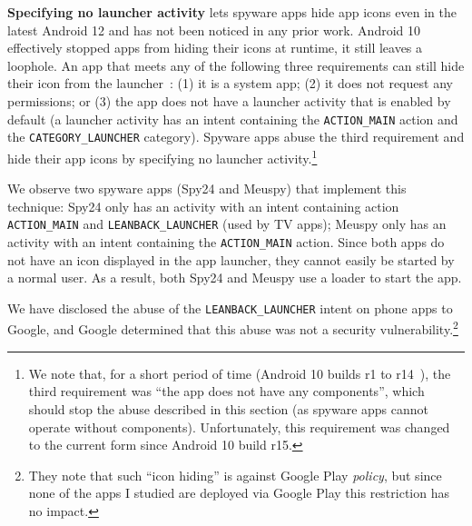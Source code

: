
\textbf{Specifying no launcher activity} lets spyware apps hide app
icons even in the latest Android 12 and has not been noticed in any prior work.
Android 10 effectively stopped apps from hiding their icons at
runtime, it still leaves a loophole. An app that meets any of the
following three requirements can still hide their icon from the
launcher~\cite{Launcher79:online}: (1) it is a system app; (2) it does
not request any permissions; or (3) the app does not have a launcher
activity that is enabled by default (a launcher activity has an intent
containing the \texttt{ACTION\_MAIN} action and the
\texttt{CATEGORY\_LAUNCHER} category). Spyware apps abuse the third
requirement and hide their app icons by specifying no launcher
activity.\footnote{We note that, for a short period of time (Android 10 builds r1 to r14~\cite{Launcher48:online}), the third requirement was ``the app does not have any components'', which should stop the abuse described in this section (as spyware apps cannot operate without components). Unfortunately, this requirement was changed to the current form since Android 10 build r15.\label{footnote:hide_icon}}

We observe two spyware apps (Spy24 and Meuspy) that implement this
technique: Spy24 only has an activity with an intent containing action
\texttt{ACTION\_MAIN} and \texttt{LEANBACK\_LAUNCHER} (used by TV
apps); Meuspy only has an activity with an intent containing
the \texttt{ACTION\_MAIN} action.
Since both apps do not have an icon displayed in the app launcher,
they cannot easily be started by a normal user.  As a result, both
Spy24 and Meuspy use a loader to start the app.

We have disclosed the abuse of the \texttt{LEANBACK\_LAUNCHER} intent
on phone apps to Google, and Google determined that
this abuse was not a security vulnerability.\footnote{They note that such ``icon hiding'' is against Google Play \emph{policy}, but since none of the apps I studied are deployed via Google Play this restriction has no impact.}

